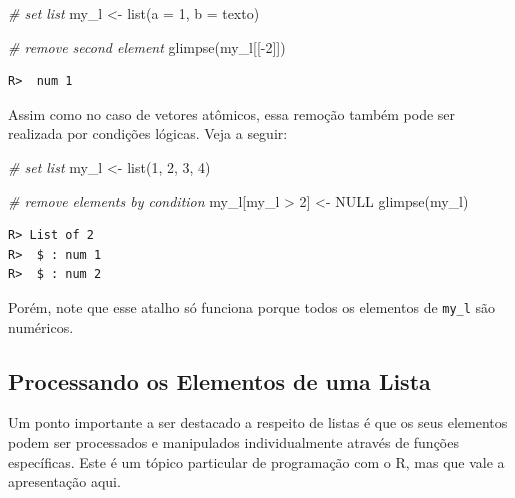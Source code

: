 \documentclass[
  11pt,
]{book}
\newenvironment{Shaded}{\begin{snugshade}}{\end{snugshade}}
\newcommand{\AttributeTok}[1]{\textcolor[rgb]{0.61,0.61,0.61}{#1}}
\newcommand{\CommentTok}[1]{\textcolor[rgb]{0.37,0.37,0.37}{\textit{#1}}}
\newcommand{\ConstantTok}[1]{\textcolor[rgb]{0,0,0}{#1}}
\newcommand{\DecValTok}[1]{\textcolor[rgb]{0.06,0.06,0.06}{#1}}
\newcommand{\FunctionTok}[1]{\textcolor[rgb]{0,0,0}{#1}}
\newcommand{\NormalTok}[1]{#1}
\newcommand{\OtherTok}[1]{\textcolor[rgb]{0.37,0.37,0.37}{#1}}
\newcommand{\SpecialCharTok}[1]{\textcolor[rgb]{0,0,0}{#1}}
\newcommand{\StringTok}[1]{\textcolor[rgb]{0.5,0.5,0.5}{#1}}
\begin{document}
\begin{Shaded}
\begin{Highlighting}[]
\CommentTok{\# set list}
\NormalTok{my\_l }\OtherTok{\textless{}{-}} \FunctionTok{list}\NormalTok{(}\AttributeTok{a =} \DecValTok{1}\NormalTok{, }\AttributeTok{b =} \StringTok{\textquotesingle{}texto\textquotesingle{}}\NormalTok{)}

\CommentTok{\# remove second element}
\FunctionTok{glimpse}\NormalTok{(my\_l[[}\SpecialCharTok{{-}}\DecValTok{2}\NormalTok{]])}
\end{Highlighting}
\end{Shaded}

\begin{verbatim}
R>  num 1
\end{verbatim}

Assim como no caso de vetores atômicos, essa remoção também pode ser realizada por condições lógicas. Veja a seguir:

\begin{Shaded}
\begin{Highlighting}[]
\CommentTok{\# set list}
\NormalTok{my\_l }\OtherTok{\textless{}{-}} \FunctionTok{list}\NormalTok{(}\DecValTok{1}\NormalTok{, }\DecValTok{2}\NormalTok{, }\DecValTok{3}\NormalTok{, }\DecValTok{4}\NormalTok{)}

\CommentTok{\# remove elements by condition}
\NormalTok{my\_l[my\_l }\SpecialCharTok{\textgreater{}} \DecValTok{2}\NormalTok{] }\OtherTok{\textless{}{-}} \ConstantTok{NULL}
\FunctionTok{glimpse}\NormalTok{(my\_l)}
\end{Highlighting}
\end{Shaded}

\begin{verbatim}
R> List of 2
R>  $ : num 1
R>  $ : num 2
\end{verbatim}

Porém, note que esse atalho só funciona porque todos os elementos de \texttt{my\_l} são numéricos.

\hypertarget{processando-os-elementos-de-uma-lista}{%
\subsection{Processando os Elementos de uma Lista}\label{processando-os-elementos-de-uma-lista}}

Um ponto importante a ser destacado a respeito de listas é que os seus elementos podem ser processados e manipulados individualmente através de funções específicas. Este é um tópico particular de programação com o R, mas que vale a apresentação aqui.
\end{document}
